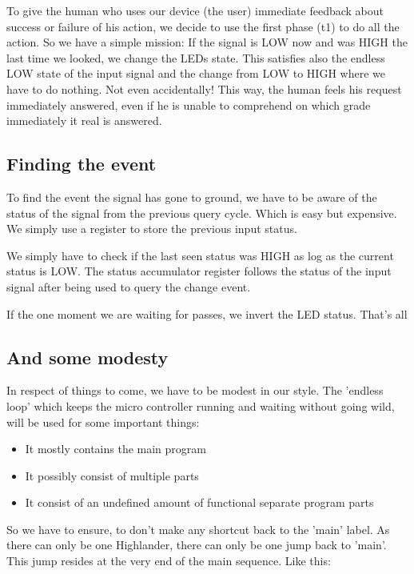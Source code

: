 To give the human who uses our device (the user) immediate feedback about success or failure of his action, we decide to use the first phase (t1) to do all the action. So we have a simple mission: If the signal is LOW now and was HIGH the last time we looked, we change the LEDs state. This satisfies also the endless LOW state of the input signal and the change from LOW to HIGH where we have to do nothing. Not even accidentally! This way, the human feels his request immediately answered, even if he is unable to comprehend on which grade immediately it real is answered.


\subsection{Finding the event}

To find the event the signal has gone to ground, we have to be aware of the status of the signal from the previous query cycle. Which is easy but expensive. We simply use a register to store the previous input status.

We simply have to check if the last seen status was HIGH as log as the current status is LOW. The status accumulator register follows the status of the input signal after being used to query the change event.

If the one moment we are waiting for passes, we invert the LED status. That's all


\subsection{And some modesty}

In respect of things to come, we have to be modest in our style. The 'endless loop' which keeps the micro controller running and waiting without going wild, will be used for some important things:

\begin{itemize}
  \item It mostly contains the main program
  \item It possibly consist of multiple parts
  \item It consist of an undefined amount of functional separate program parts
\end{itemize}

So we have to ensure, to don't make any shortcut back to the 'main' label. As there can only be one Highlander, there can only be one jump back to 'main'. This jump resides at the very end of the main sequence. Like this:


